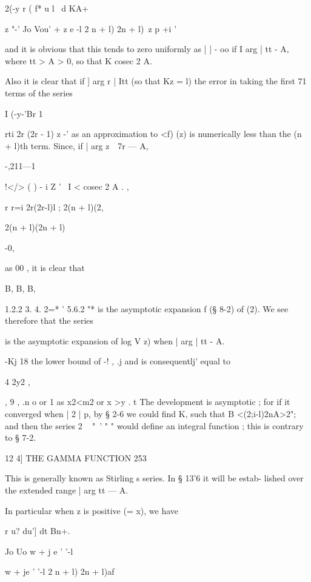2(-y r ( f* u l \ d KA+

z "-' Jo Vou' + z e -l 2 n + l) 2n + l)\ z p +i '

and it is obvious that this tends to zero uniformly as | | - oo if I
arg | tt - A, where tt > A > 0, so that K cosec 2 A.

Also it is clear that if ] arg r | Itt (so that Kz = l) the error in
taking the first 71 terms of the series

I (-y-'Br 1

rti 2r (2r - 1) z -' as an approximation to <f) (z) is numerically
less than the (n + l)th term. Since, if | arg z\ \ 7r — A,



-,211—1



!</> ( ) - i Z ' \ I < cosec 2 A . ,

r r=i 2r(2r-l)l ; 2(n + l)(2,



2(n + l)(2n + l)

-0,

as 00 , it is clear that

B, B, B,



1.2.2 3. 4. 2=* ' 5.6.2 "* is the asymptotic expansion f (§ 8-2) of
(2). We see therefore that the series

is the asymptotic expansion of log V z) when | arg | tt - A.

-Kj 18 the lower bound of -! , .j and is consequentlj' equal to

4 2y2 ,

, 9 , .n o or 1 as x2<m2 or x >y . t The development is asymptotic ;
for if it converged when | 2 | p, by § 2-6 we could find K, such that
B <(2;i-l)2nA>2"; and then the series 2 ~ "~' " " would define an
integral function ; this is contrary to § 7-2.



12 4] THE GAMMA FUNCTION 253

This is generally known as Stirling s series. In § 13'6 it will be
estab- lished over the extended range | arg tt — A.

In particular when z is positive (= x), we have

r u? du'] dt Bn+.



Jo Uo w + j e ' '-l



w + je ' '-l 2 n + l) 2n + l)af


